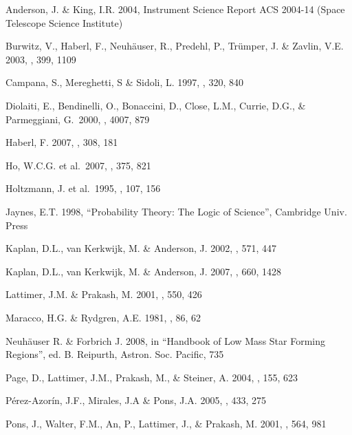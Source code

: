 \documentclass[12pt,preprint]{aastex}
\begin{document}
\begin{thebibliography}{}


 Anderson, J. \& King, I.R. 2004,
Instrument Science Report ACS 2004-14 (Space Telescope Science Institute)

 Burwitz, V., Haberl, F., Neuh\"auser, R., Predehl, P., Tr\"umper, J. \& Zavlin, V.E. 2003, \aap, 399, 1109

 Campana, S., Mereghetti, S \& Sidoli, L.
   1997, \aap, 320, 840

 Diolaiti, E., 
Bendinelli, O., Bonaccini, D., Close, L.M., Currie, D.G., 
\& Parmeggiani, G.\ 2000, \procspie, 4007, 879 

 Haberl, F. 2007, \apss, 308, 181

 Ho, W.C.G. et al.\ 2007, \mnras, 375, 821

Holtzmann, J. et al.\ 1995, \pasp, 107, 156

 Jaynes, E.T. 1998, ``Probability Theory: The Logic of Science'', Cambridge Univ. Press

 Kaplan, D.L., van Kerkwijk, M. \& Anderson, J. 2002, \apj, 571, 447

 Kaplan, D.L., van Kerkwijk, M. \& Anderson, J. 2007, \apj, 660, 1428

 Lattimer, J.M. \& Prakash, M. 2001,
   \apj, 550, 426

 Maracco, H.G. \& Rydgren, A.E. 1981, \aj, 86, 62

 Neuh\"auser R. \& Forbrich J. 
   2008, in ``Handbook of Low Mass Star Forming Regions'', ed. B. Reipurth,
   Astron. Soc. Pacific, 735

 Page, D., Lattimer, J.M., Prakash, M., \&
   Steiner, A. 2004, \apjs, 155, 623

 P\'erez-Azor\'in, J.F., Mirales, J.A \& Pons, J.A. 2005, \aap, 433, 275

 Pons, J., Walter, F.M., An, P., Lattimer, J.,
     \& Prakash, M. 2001, \apj,  564, 981


\end{thebibliography}
\end{document}
